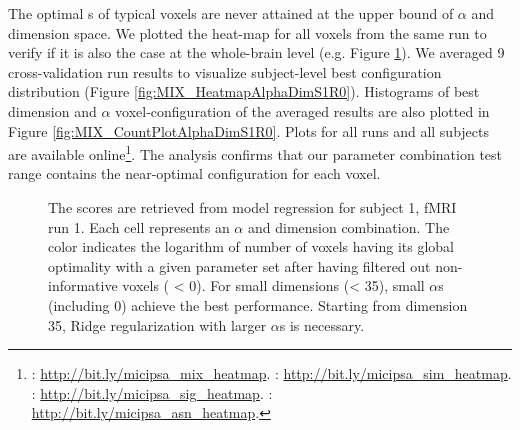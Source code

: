 The optimal s of typical voxels are never attained at the upper bound of \(\alpha\) and dimension space. We plotted the heat-map for all voxels from the same run to verify if it is also the case at the whole-brain level (e.g. Figure \ref{fig:MIX_HeatmapAlphaDimS1R1}). We averaged 9 cross-validation run results to visualize subject-level best configuration distribution (Figure \ref{fig:MIX_HeatmapAlphaDimS1R0}). Histograms of best dimension and \(\alpha\) voxel-configuration of the averaged results are also plotted in Figure \ref{fig:MIX_CountPlotAlphaDimS1R0}. Plots for all runs and all subjects are available online\footnote{: \url{http://bit.ly/micipsa_mix_heatmap}. : \url{http://bit.ly/micipsa_sim_heatmap}. : \url{http://bit.ly/micipsa_sig_heatmap}. : \url{http://bit.ly/micipsa_asn_heatmap}.}. The analysis confirms that our parameter combination test range contains the near-optimal configuration for each voxel.

\begin{figure}
    \centering
    
            \caption[Session Best Hyper-parameter Configuration Voxel-Count Heat-map]{The scores are retrieved from  model regression for subject 1, fMRI run 1. Each cell represents an \(\alpha\) and dimension combination. The color indicates the logarithm of number of voxels having its global optimality with a given parameter set after having filtered out non-informative voxels ( < 0). For small dimensions (< 35), small \(\alpha\)s (including 0) achieve the best performance. Starting from dimension 35, Ridge regularization with larger \(\alpha\)s is necessary.} 
            \label{fig:MIX_HeatmapAlphaDimS1R1}
   
\end{figure}

